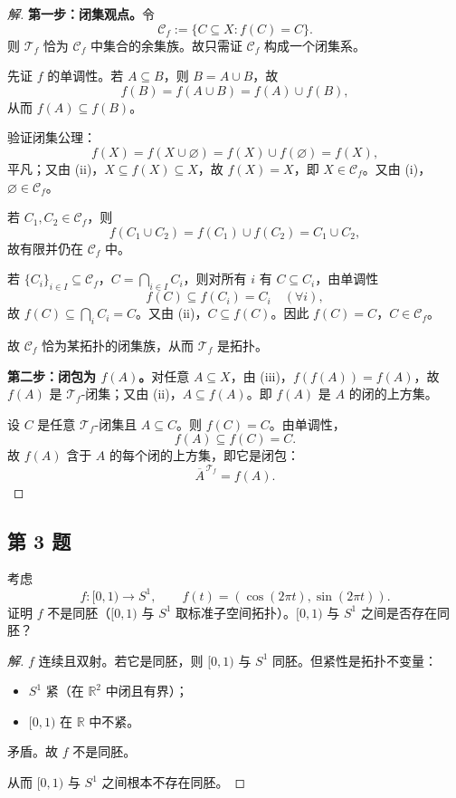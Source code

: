 \documentclass[11pt,a4paper]{article}
\newcommand{\R}{\mathbb{R}}
\theoremstyle{definition}
\newenvironment{solution}{\begin{proof}[解]}{\end{proof}}
\begin{document}
\begin{solution}
\textbf{第一步：闭集观点。}令
\[
  \mathcal{C}_f := \{C \subseteq X : f(C) = C\}.
\]
则 $\mathcal{T}_f$ 恰为 $\mathcal{C}_f$ 中集合的余集族。故只需证 $\mathcal{C}_f$ 构成一个闭集系。

先证 $f$ 的单调性。若 $A \subseteq B$，则 $B = A \cup B$，故
\[
  f(B) = f(A \cup B) = f(A) \cup f(B),
\]
从而 $f(A) \subseteq f(B)$。

验证闭集公理：
\[
  f(X) = f(X \cup \varnothing) = f(X) \cup f(\varnothing) = f(X),
\]
平凡；又由 (ii)，$X \subseteq f(X) \subseteq X$，故 $f(X) = X$，即 $X \in \mathcal{C}_f$。又由 (i)，$\varnothing \in \mathcal{C}_f$。

若 $C_1, C_2 \in \mathcal{C}_f$，则
\[
  f(C_1 \cup C_2) = f(C_1) \cup f(C_2) = C_1 \cup C_2,
\]
故有限并仍在 $\mathcal{C}_f$ 中。

若 $\{C_i\}_{i \in I} \subseteq \mathcal{C}_f$，$C = \bigcap_{i \in I} C_i$，则对所有 $i$ 有 $C \subseteq C_i$，由单调性
\[
  f(C) \subseteq f(C_i) = C_i \quad (\forall i),
\]
故 $f(C) \subseteq \bigcap_i C_i = C$。又由 (ii)，$C \subseteq f(C)$。因此 $f(C) = C$，$C \in \mathcal{C}_f$。

故 $\mathcal{C}_f$ 恰为某拓扑的闭集族，从而 $\mathcal{T}_f$ 是拓扑。

\textbf{第二步：闭包为 $f(A)$。}对任意 $A \subseteq X$，由 (iii)，$f(f(A)) = f(A)$，故 $f(A)$ 是 $\mathcal{T}_f$-闭集；又由 (ii)，$A \subseteq f(A)$。即 $f(A)$ 是 $A$ 的闭的上方集。

设 $C$ 是任意 $\mathcal{T}_f$-闭集且 $A \subseteq C$。则 $f(C) = C$。由单调性，
\[
  f(A) \subseteq f(C) = C.
\]
故 $f(A)$ 含于 $A$ 的每个闭的上方集，即它是闭包：
\[
  \overline{A}^{\,\mathcal{T}_f} = f(A).
\]
\end{solution}

\subsection{第 3 题}

考虑
\[
  f : [0,1) \to S^1, \qquad f(t) = (\cos(2\pi t),\sin(2\pi t)).
\]
证明 $f$ 不是同胚（$[0,1)$ 与 $S^1$ 取标准子空间拓扑）。$[0,1)$ 与 $S^1$ 之间是否存在同胚？

\begin{solution}
$f$ 连续且双射。若它是同胚，则 $[0,1)$ 与 $S^1$ 同胚。但紧性是拓扑不变量：
\begin{itemize}
  \item $S^1$ 紧（在 $\R^2$ 中闭且有界）；
  \item $[0,1)$ 在 $\R$ 中不紧。
\end{itemize}
矛盾。故 $f$ 不是同胚。

从而 $[0,1)$ 与 $S^1$ 之间根本不存在同胚。
\end{solution}
\end{document}
